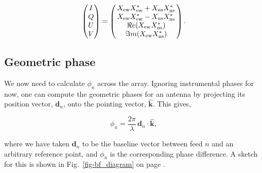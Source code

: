 \begin{equation}
\begin{pmatrix}
I \\ 
Q \\ 
U\\ 
V
\end{pmatrix}
= \begin{pmatrix}
\, X_{\rm ew} X_{\rm ew}^* + X_{\rm ns} X_{\rm ns}^*\, \\ 
\, X_{\rm ew} X_{\rm ew}^* - X_{\rm ns} X_{\rm ns}^* \,\\ 
\, \Re e(X_{\rm ew} X_{\rm ns}^*)\,\\ 
\, \Im m(X_{\rm ew} X_{\rm ns}^*)\,
\end{pmatrix}.
\end{equation}



\subsection{Geometric phase}

We now need to calculate $\phi_n$ across the array.
Ignoring instrumental phases for now, one can compute the geometric 
phases for an antenna by projecting its position vector, $\mathbf{d}_n$, 
onto the pointing vector, $\hat{\mathbf{k}}$. This gives,

\begin{equation}
\label{eqn-phi_n}
\phi_n = \frac{2\pi}{\lambda} \, \mathbf{d}_n \cdot  {\mathbf{\hat{k}}},
\end{equation}

\noindent where we have taken $\mathbf{d}_n$ to be the baseline vector between 
feed $n$ and an arbitrary reference point, and $\phi_n$ is the corresponding 
phase difference. A sketch for this is shown in Fig.~\ref{fig-bf_diagram} on page 
\pageref{fig-bf_diagram}.


